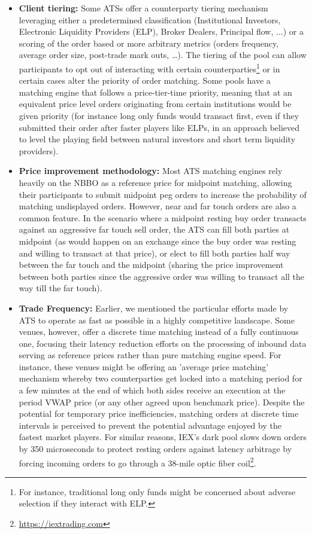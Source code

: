 \begin{itemize}
\item{\textbf{Client tiering:}} Some ATSs offer a counterparty tiering mechanism leveraging either a predetermined classification (Institutional Investors, Electronic Liquidity Providers (ELP), Broker Dealers, Principal flow, ...) or a scoring of the order based or more arbitrary metrics (orders frequency, average order size, post-trade mark outs, \dots). The tiering of the pool can allow participants to opt out of interacting with certain counterparties\footnote{For instance, traditional long only funds might be concerned about adverse selection if they interact with ELP.} or in certain cases alter the priority of order matching. Some pools have a matching engine that follows a price-tier-time priority, meaning that at an equivalent price level orders originating from certain institutions would be given priority (for instance long only funds would transact first, even if they submitted their order after faster players like ELPs, in an approach believed to level the playing field between natural investors and short term liquidity providers). 

\item{\textbf{Price improvement methodology:}} Most ATS matching engines rely heavily on the NBBO as a reference price for midpoint matching, allowing their participants to submit midpoint peg orders to increase the probability of matching undisplayed orders. However, near and far touch orders are also a common feature. In the scenario where a midpoint resting buy order transacts against an aggressive far touch sell order, the ATS can fill both parties at midpoint (as would happen on an exchange since the buy order was resting and willing to transact at that price), or elect to fill both parties half way between the far touch and the midpoint (sharing the price improvement between both parties since the aggressive order was willing to transact all the way till the far touch). 

\item{\textbf{Trade Frequency:}} Earlier, we mentioned the particular efforts made by ATS to operate as fast as possible in a highly competitive landscape. Some venues, however, offer a discrete time matching instead of a fully continuous one, focusing their latency reduction efforts on the processing of inbound data serving as reference prices rather than pure matching engine speed. For instance, these venues might be offering an 'average price matching' mechanism whereby two counterparties get locked into a matching period for a few minutes at the end of which both sides receive an execution at the period VWAP price (or any other agreed upon benchmark price). Despite the potential for temporary price inefficiencies, matching orders at discrete time intervals is perceived to prevent the potential advantage enjoyed by the fastest market players. For similar reasons, IEX's dark pool slows down orders by 350 microseconds to protect resting orders against latency arbitrage by forcing incoming orders to go through a 38-mile optic fiber coil\footnote{\url{https://iextrading.com}}.


\end{itemize}
